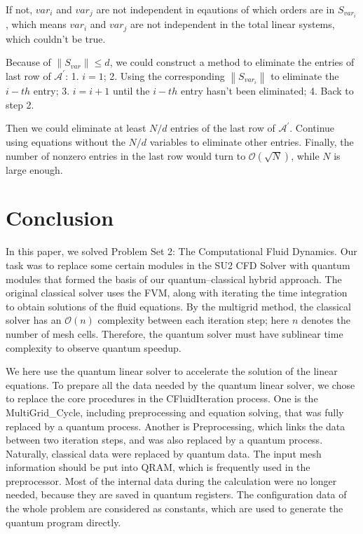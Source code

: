 \documentclass[%
 reprint,
 amsmath,amssymb,
pra,
]{revtex4-1}
\begin{document}
If not, $var_i$ and $var_j$ are not independent in eqautions of which orders are in $S_{var_i}$,  which means $var_i$ and $var_j$ are not independent in the total linear systems, which couldn't be true. 

Because of $\left\|S_{var}\right\|\leq d$, we could construct a method to eliminate the entries of last row of $\mathcal{A^{\prime}}$: 1. $i=1$; 2. Using the corresponding $\left\|S_{var_i}\right\|$ to eliminate the $i-th$ entry; 3. $i=i+1$ until the $i-th$ entry hasn't been eliminated; 4. Back to step 2. 

Then we could eliminate at least $N/d$ entries of the last row of $\mathcal{A^{\prime}}$. Continue using equations without the $N/d$ variables to eliminate other entries. Finally, the number of nonzero entries in the last row would turn to $\mathcal{O}(\sqrt{N})$, while $N$ is large enough.
\fi


\section{Conclusion}

In this paper, we solved Problem Set 2: The Computational Fluid Dynamics. Our task was to replace some certain modules in the SU2 CFD Solver with quantum modules that formed the basis of our quantum--classical hybrid approach. The original classical solver uses the FVM, along with iterating the time integration to obtain solutions of the fluid equations. By the multigrid method, the classical solver has an $\mathcal{O}(n)$ complexity between each iteration step; here $n$ denotes the number of mesh cells. Therefore, the quantum solver must have sublinear time complexity to observe quantum speedup.

We here use the quantum linear solver to accelerate the solution of the linear equations. To prepare all the data needed by the quantum linear solver, we chose to replace the core procedures in the CFluidIteration process. One is the MultiGrid\_Cycle, including preprocessing and equation solving, that was fully replaced by a quantum process. Another is Preprocessing, which links the data between two iteration steps, and was also replaced by a quantum process. Naturally, classical data were replaced by quantum data. The input mesh information should be put into QRAM, which is frequently used in the preprocessor. Most of the internal data during the calculation were no longer needed, because they are saved in quantum registers. The configuration data of the whole problem are considered as constants, which are used to generate the quantum program directly.
\end{document}

